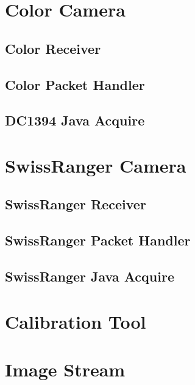 \section{Color Camera} \label{colorcam}

	
	\subsection{Color Receiver} \label{colorreceiver}
	
	\subsection{Color Packet Handler} \label{colorpackethandler}
	
	\subsection{DC1394 Java Acquire} \label{dc1394javaacquire}
	
	
\section{SwissRanger Camera} \label{swissrangercam}

	
	\subsection{SwissRanger Receiver} \label{swissrangerreceiver}
	
	\subsection{SwissRanger Packet Handler} \label{swissrangerpackethandler}
	
	\subsection{SwissRanger Java Acquire} \label{swissrangerjavaacquire}
	
		
\section{Calibration Tool} \label{calibrationtool}

	
\section{Image Stream} \label{imagestream}

